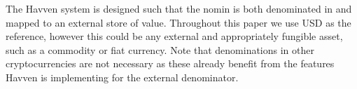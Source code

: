 \noindent The Havven system is designed such that the nomin is both denominated in and
mapped to an external store of value. Throughout this paper we use USD as the reference, however this could
be any external and appropriately fungible asset, such as a commodity or fiat currency. Note that denominations
in other cryptocurrencies are not necessary as these already benefit from the features Havven is implementing
for the external denominator. \\

\pagebreak
